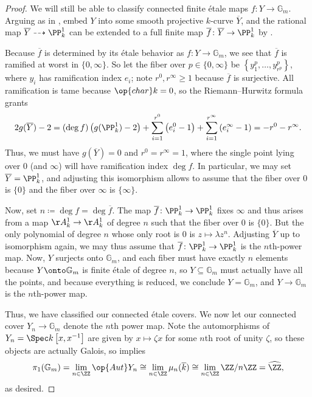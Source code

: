 \documentclass{amsart}
\begin{document}
\begin{proof}
    We will still be able to classify connected finite \'etale maps $f\colon Y\to\mathbb G_m$. Arguing as in , embed $Y$ into some smooth projective $k$-curve $\overline Y$, and the rational map $\overline Y\dashrightarrow\PP^1_k$ can be extended to a full finite map $\overline f\colon\overline Y\to\PP^1_k$ by \cite[Proposition~I.6.8]{hartshorne}.

    Because $\overline f$ is determined by its \'etale behavior as $f\colon Y\to\mathbb G_m$, we see that $\overline f$ is ramified at worst in $\{0,\infty\}$. So let the fiber over $p\in\{0,\infty\}$ be $\left\{y_1^p,\ldots,y_{r^p}^{p}\right\}$, where $y_i$ has ramification index $e_i$; note $r^0,r^\infty\ge1$ because $\overline f$ is surjective. All ramification is tame because $\op{char}k=0$, so the Riemann--Hurwitz formula grants
    \[2g(\overline Y)-2=(\deg f)\left(g(\PP^1_k)-2\right)+\sum_{i=1}^{r^0}\left(e_i^0-1\right)+\sum_{i=1}^{r^\infty}\left(e_i^\infty-1\right)=-r^0-r^\infty.\]
    Thus, we must have $g(\overline Y)=0$ and $r^0=r^\infty=1$, where the single point lying over $0$ (and $\infty$) will have ramification index $\deg f$. In particular, we may set $\overline Y=\PP^1_k$, and adjusting this isomorphism allows to assume that the fiber over $0$ is $\{0\}$ and the fiber over $\infty$ is $\{\infty\}$.

    Now, set $n\coloneqq\deg f=\deg\overline f$. The map $\overline f\colon\PP^1_k\to\PP^1_k$ fixes $\infty$ and thus arises from a map $\AA^1_k\to\AA^1_k$ of degree $n$ such that the fiber over $0$ is $\{0\}$. But the only polynomial of degree $n$ whose only root is $0$ is $z\mapsto\lambda z^n$. Adjusting $\overline Y$ up to isomorphism again, we may thus assume that $\overline f\colon\PP^1_k\to\PP^1_k$ is the $n$th-power map. Now, $Y$ surjects onto $\mathbb G_m$, and each fiber must have exactly $n$ elements because $Y\onto\mathbb G_m$ is finite \'etale of degree $n$, so $Y\subseteq\mathbb G_m$ must actually have all the points, and because everything is reduced, we conclude $Y=\mathbb G_m$, and $Y\to\mathbb G_m$ is the $n$th-power map.

    Thus, we have classified our connected \'etale covers. We now let our connected cover $Y_n\to\mathbb G_m$ denote the $n$th power map. Note the automorphisms of $Y_n=\Spec k\left[x,x^{-1}\right]$ are given by $x\mapsto\zeta x$ for some $n$th root of unity $\zeta$, so these objects are actually Galois, so  implies
    \[\pi_1(\mathbb G_m)=\lim_{n\in\ZZ}\op{Aut}Y_n\cong\lim_{n\in\ZZ}\mu_n(\overline k)\cong\lim_{n\in\ZZ}\ZZ/n\ZZ=\widehat\ZZ,\]
    as desired.
\end{proof}
\end{document}
